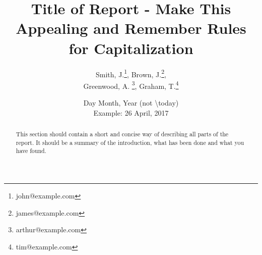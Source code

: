 \documentclass[11pt]{article}
\title{
    Title of Report - Make This Appealing and Remember Rules for Capitalization
    }
\author{
	Smith, J.\footnote{john@example.com}, Brown, J.\footnote{james@example.com}, \\
    Greenwood, A. \footnote{arthur@example.com}, Graham, T.\footnote{tim@example.com}
}
\date{
    Day Month, Year (not \textbackslash today)\\
    Example: 26 April, 2017
}
\begin{document}
\maketitle
\begin{abstract}
    This section should contain a short and concise way of describing all parts of the report. It should be a summary of the introduction, what has been done and what you have found.
\end{abstract}
\newpage
\tableofcontents
\newpage
{} %






\newpage


\appendix
{}



\end{document}
